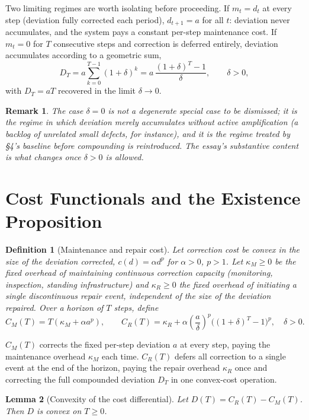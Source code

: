 \documentclass[11pt]{article}
\newtheorem{definition}{Definition}[section]
\newtheorem{lemma}[definition]{Lemma}
\newtheorem*{remark}{Remark}
\begin{document}
Two limiting regimes are worth isolating before proceeding. If $m_t = d_t$ at every step (deviation fully corrected each period), $d_{t+1} = a$ for all $t$: deviation never accumulates, and the system pays a constant per-step maintenance cost. If $m_t = 0$ for $T$ consecutive steps and correction is deferred entirely, deviation accumulates according to a geometric sum,
\[
D_T = a\sum_{k=0}^{T-1}(1+\delta)^k = a\,\frac{(1+\delta)^T - 1}{\delta}, \qquad \delta > 0,
\]
with $D_T = aT$ recovered in the limit $\delta \to 0$.

\begin{remark}
The case $\delta = 0$ is not a degenerate special case to be dismissed; it is the regime in which deviation merely accumulates without active amplification (a backlog of unrelated small defects, for instance), and it is the regime treated by \S 4's baseline before compounding is reintroduced. The essay's substantive content is what changes once $\delta > 0$ is allowed.
\end{remark}

\section{Cost Functionals and the Existence Proposition}

\begin{definition}[Maintenance and repair cost]
Let correction cost be convex in the size of the deviation corrected, $c(d) = \alpha d^p$ for $\alpha > 0$, $p > 1$. Let $\kappa_M \geq 0$ be the fixed overhead of maintaining continuous correction capacity (monitoring, inspection, standing infrastructure) and $\kappa_R \geq 0$ the fixed overhead of initiating a single discontinuous repair event, independent of the size of the deviation repaired. Over a horizon of $T$ steps, define
\[
C_M(T) = T(\kappa_M + \alpha a^p), \qquad
C_R(T) = \kappa_R + \alpha\left(\frac{a}{\delta}\right)^{p}\big((1+\delta)^T - 1\big)^{p}, \quad \delta > 0.
\]
\end{definition}

$C_M(T)$ corrects the fixed per-step deviation $a$ at every step, paying the maintenance overhead $\kappa_M$ each time. $C_R(T)$ defers all correction to a single event at the end of the horizon, paying the repair overhead $\kappa_R$ once and correcting the full compounded deviation $D_T$ in one convex-cost operation.

\begin{lemma}[Convexity of the cost differential]
\label{lem:convex-D}
Let $D(T) = C_R(T) - C_M(T)$. Then $D$ is convex on $T \geq 0$.
\end{lemma}
\end{document}
